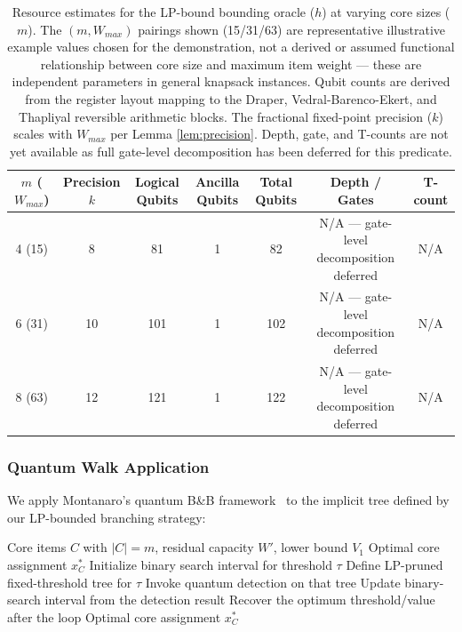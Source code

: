 \documentclass[conference]{IEEEtran} \IEEEoverridecommandlockouts
\begin{document}
\begin{table}[ht]
\centering
\caption{Resource estimates for the LP-bound bounding oracle ($h$) at varying core sizes ($m$). The $(m, W_{max})$ pairings shown (15/31/63) are representative illustrative example values chosen for the demonstration, not a derived or assumed functional relationship between core size and maximum item weight --- these are independent parameters in general knapsack instances. Qubit counts are derived from the register layout mapping to the Draper, Vedral-Barenco-Ekert, and Thapliyal reversible arithmetic blocks. The fractional fixed-point precision ($k$) scales with $W_{max}$ per Lemma \ref{lem:precision}. Depth, gate, and T-counts are not yet available as full gate-level decomposition has been deferred for this predicate.}
\label{tab:h_resources}
\begin{tabular}{ccccccc}
\hline\hline
$m$ ($W_{max}$) & Precision $k$ & Logical Qubits & Ancilla Qubits & Total Qubits & Depth / Gates & T-count \\
\hline
4 (15) & 8 & 81 & 1 & 82 & N/A --- gate-level decomposition deferred & N/A \\
6 (31) & 10 & 101 & 1 & 102 & N/A --- gate-level decomposition deferred & N/A \\
8 (63) & 12 & 121 & 1 & 122 & N/A --- gate-level decomposition deferred & N/A \\
\hline\hline
\end{tabular}
\end{table}

\subsubsection{Quantum Walk Application}

We apply Montanaro's quantum B\&B framework~\cite{ref24} to the implicit tree defined by our LP-bounded branching strategy:

\begin{algorithm}[h]
\caption{Classical Threshold-Search Outer Loop (Phase 2)}
\label{alg:qbb}
\begin{algorithmic}[1]
\REQUIRE Core items $C$ with $|C| = m$, residual capacity $W'$, lower bound $V_1$
\ENSURE Optimal core assignment $x^*_C$
\STATE Initialize binary search interval for threshold $\tau$
\STATE Define LP-pruned fixed-threshold tree for $\tau$
\STATE Invoke quantum detection on that tree
\STATE Update binary-search interval from the detection result
\ENDWHILE
\STATE Recover the optimum threshold/value after the loop
\RETURN Optimal core assignment $x^*_C$
\end{algorithmic}
\end{algorithm}
\end{document}
